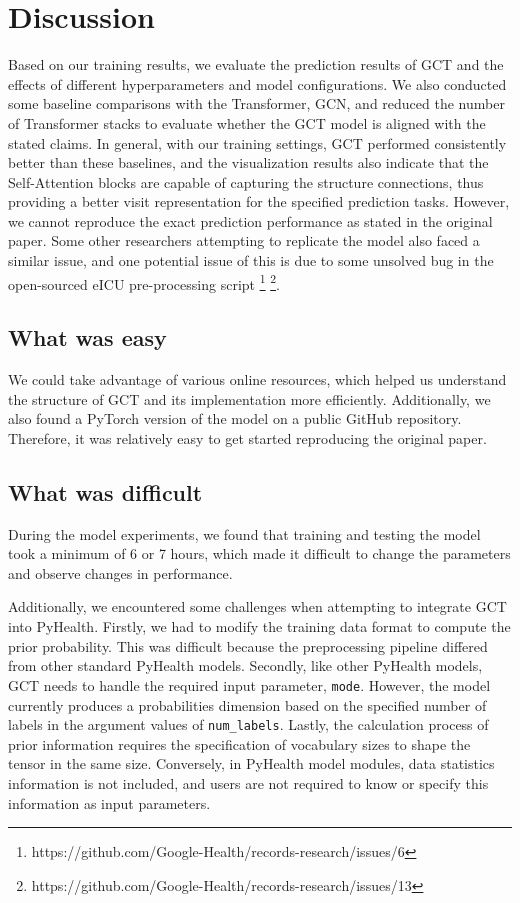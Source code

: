\documentclass[11pt,a4paper]{article}
\begin{document}
\section{Discussion}
Based on our training results, we evaluate the prediction results of GCT and the effects of different hyperparameters and model configurations. We also conducted some baseline comparisons with the Transformer, GCN, and reduced the number of Transformer stacks to evaluate whether the GCT model is aligned with the stated claims. In general, with our training settings, GCT performed consistently better than these baselines, and the visualization results also indicate that the Self-Attention blocks are capable of capturing the structure connections, thus providing a better visit representation for the specified prediction tasks. However, we cannot reproduce the exact prediction performance as stated in the original paper. Some other researchers attempting to replicate the model also faced a similar issue, and one potential issue of this is due to some unsolved bug in the open-sourced eICU pre-processing script
\footnote{https://github.com/Google-Health/records-research/issues/6}
\footnote{https://github.com/Google-Health/records-research/issues/13}.

\subsection{What was easy}
We could take advantage of various online resources, which helped us understand the structure of GCT and its implementation more efficiently. Additionally, we also found a PyTorch version of the model on a public GitHub repository. Therefore, it was relatively easy to get started reproducing the original paper.

\subsection{What was difficult}
During the model experiments, we found that training and testing the model took a minimum of 6 or 7 hours, which made it difficult to change the parameters and observe changes in performance.

Additionally, we encountered some challenges when attempting to integrate GCT into PyHealth. Firstly, we had to modify the training data format to compute the prior probability. This was difficult because the preprocessing pipeline differed from other standard PyHealth models. Secondly, like other PyHealth models, GCT needs to handle the required input parameter, \texttt{mode}. However, the model currently produces a probabilities dimension based on the specified number of labels in the argument values of \texttt{num\_labels}. Lastly, the calculation process of prior information requires the specification of vocabulary sizes to shape the tensor in the same size. Conversely, in PyHealth model modules, data statistics information is not included, and users are not required to know or specify this information as input parameters.
\end{document}
